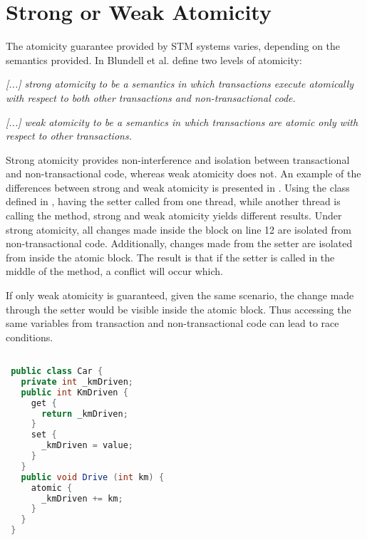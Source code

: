\section{Strong or Weak Atomicity}
\label{sec:design_strong_weak_atomicity}
The atomicity guarantee provided by \ac{STM} systems varies, depending on the semantics provided. In \cite{blundell2006subtleties} Blundell et al. define two levels of atomicity:
%
\begin{defn}\label{def:strong_atomicity}
\emph{[...] strong atomicity to be a semantics in which transactions execute atomically
with respect to both other transactions and non-transactional code.}
\end{defn}
%
\begin{defn}\label{def:weak_atomicity}
\emph{[...] weak atomicity to be a semantics in which transactions are atomic only with respect to other transactions.}
\end{defn}

Strong atomicity provides non-interference and isolation between transactional and non-transactional code, whereas weak atomicity does not. An example of the differences between strong and weak atomicity is presented in . Using the  class defined in , having the  setter called from one thread, while another thread is calling the  method, strong and weak atomicity yields different results. Under strong atomicity, all changes made inside the  block on line 12 are isolated from non-transactional code. Additionally, changes made from the setter are isolated from inside the atomic block. The result is that if the setter is called in the middle of the  method, a conflict will occur which.

If only weak atomicity is guaranteed, given the same scenario, the change made through the setter would be visible inside the atomic block. Thus accessing the same variables from transaction and non-transactional code can lead to race conditions.
%

\begin{lstlisting}[label=lst:atomicity,
 caption={Level of Atomicity},
 language=Java, 
 showspaces=false,
 showtabs=false,
 breaklines=true,
 showstringspaces=false,
 breakatwhitespace=true,
 commentstyle=\color{greencomments},
 keywordstyle=\color{bluekeywords},
 stringstyle=\color{redstrings},
 morekeywords={atomic, retry, orElse, var, get, set}]  % Start your code-block

 public class Car {
   private int _kmDriven;
   public int KmDriven {
     get {
       return _kmDriven;
     }
     set {
       _kmDriven = value;
     }
   }
   public void Drive (int km) {
     atomic {
       _kmDriven += km;
     }
   }
 }
\end{lstlisting}

